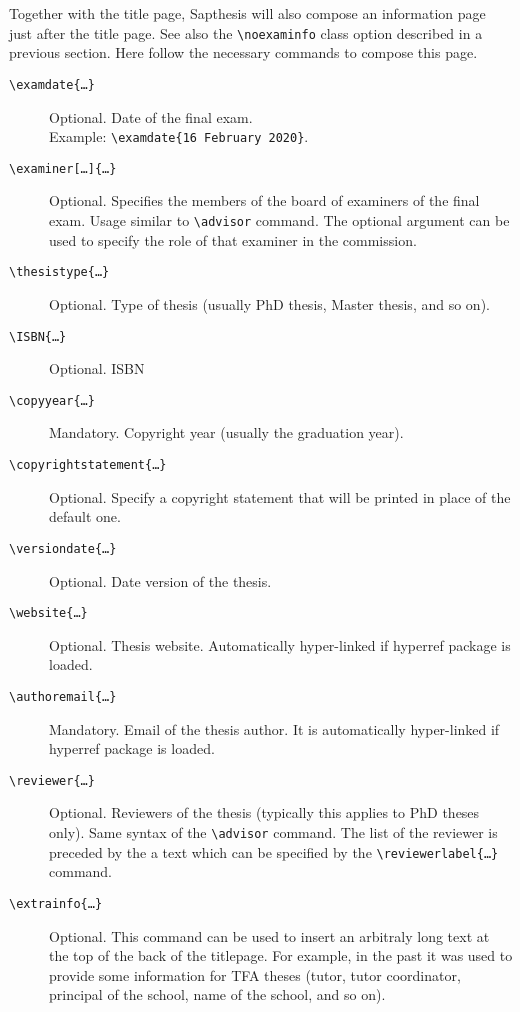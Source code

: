 \documentclass[a5paper,12pt]{article}
\newcommand{\bs}{\textbackslash}
\begin{document}
Together with the title page, \textsf{Sapthesis} will also compose an information page just after the title page. See also the \texttt{\bs noexaminfo} class option described in a previous section. Here follow the necessary commands to compose this page.
\begin{description}
\item[\texttt{\bs examdate\{\dots\}}] Optional. Date of the final exam.\\
Example: \texttt{\bs examdate\{16 February 2020\}}.

\item[\texttt{\bs examiner[\dots]\{\dots\}}] Optional. Specifies the members of the
board of examiners of the final exam. Usage similar to \texttt{\bs advisor} command. The optional argument can be used to specify the role of that examiner in the commission.

\item[\texttt{\bs thesistype\{\dots\}}] Optional. Type of thesis (usually PhD thesis, Master thesis, and so on). 

\item[\texttt{\bs ISBN\{\dots\}}] Optional. ISBN

\item[\texttt{\bs copyyear\{\dots\}}] Mandatory. Copyright year (usually the 
graduation year).

\item[\texttt{\bs copyrightstatement\{\dots\}}] Optional. Specify a copyright statement that will be printed in place of the default one.

\item[\texttt{\bs versiondate\{\dots\}}] Optional. Date version of the thesis.

\item[\texttt{\bs website\{\dots\}}] Optional. Thesis website. Automatically 
hyper-linked if \textsf{hyperref} package is loaded.

\item[\texttt{\bs authoremail\{\dots\}}] Mandatory. Email of the thesis author.
It is automatically hyper-linked if \textsf{hyperref} package is loaded.

\item[\texttt{\bs reviewer\{\dots\}}] Optional. Reviewers of the thesis (typically this applies to PhD theses only). Same syntax of the \texttt{\bs advisor} command. The list of the reviewer is preceded by the a text which can be specified by the \texttt{\bs reviewerlabel\{\dots\}} command.

\item[\texttt{\bs extrainfo\{\dots\}}] Optional. This command can be used to insert an arbitraly long text at the top of the back of the titlepage. For example, in the past it was used to provide some information for TFA theses (tutor, tutor coordinator, principal of the school, name of the school, and so on). 


\end{description}
\end{document}
